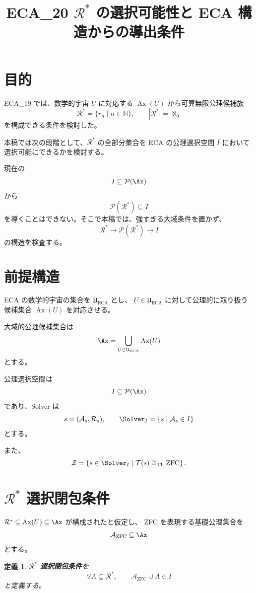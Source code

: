 \documentclass[a4paper,11pt]{ltjsarticle}
\title{ECA_20 $\mathcal{R}^*$ の選択可能性と ECA 構造からの導出条件}
\author{}
\date{}
\newtheorem{definition}{定義}
\begin{document}
\maketitle

\section{目的}
ECA_19 では、数学的宇宙 $U$ に対応する
$\operatorname{Ax}(U)$ から可算無限公理候補族
\[
\mathcal{R}^*=\{r_n\mid n\in\mathbb N\},
\qquad |\mathcal{R}^*|=\aleph_0
\]
を構成できる条件を検討した。

本稿では次の段階として、$\mathcal{R}^*$ の全部分集合を ECA の公理選択空間 $I$ において選択可能にできるかを検討する。

現在の
\[
I\subseteq\mathcal{P}(\Ax)
\]
から
\[
\mathcal{P}(\mathcal{R}^*)\subseteq I
\]
を導くことはできない。そこで本稿では、強すぎる大域条件を置かず、
\[
\mathcal{R}^*\longrightarrow\mathcal{P}(\mathcal{R}^*)
\longrightarrow I
\]
の構造を検査する。

\section{前提構造}
ECA の数学的宇宙の集合を $\mathfrak U_{\mathrm{ECA}}$ とし、
$U\in\mathfrak U_{\mathrm{ECA}}$ に対して公理的に取り扱う候補集合
$\operatorname{Ax}(U)$ を対応させる。

大域的公理候補集合は
\[
\Ax=\bigcup_{U\in\mathfrak U_{\mathrm{ECA}}}\operatorname{Ax}(U)
\]
とする。

公理選択空間は
\[
I\subseteq\mathcal{P}(\Ax)
\]
であり、Solver は
\[
s=(\mathcal{A}_s,\mathcal{R}_s),
\qquad
\Solver_I=\{s\mid\mathcal{A}_s\in I\}
\]
とする。

また、
\[
\mathcal{Z}=
\left\{
s\in\Solver_I\mid
\mathcal{T}(s)\cong_{\mathrm{Th}}\mathrm{ZFC}
\right\}.
\]

\section{$\mathcal{R}^*$ 選択閉包条件}
$\mathcal{R}^*\subseteq\operatorname{Ax}(U)\subseteq\Ax$ が構成されたと仮定し、
ZFC を表現する基礎公理集合を
\[
\mathcal{A}_{\mathrm{ZFC}}\subseteq\Ax
\]
とする。

\begin{definition}
\textbf{$\mathcal{R}^*$ 選択閉包条件}を
\[
\boxed{
\forall A\subseteq\mathcal{R}^*,
\qquad
\mathcal{A}_{\mathrm{ZFC}}\cup A\in I
}
\]
と定義する。
\end{definition}
\end{document}

